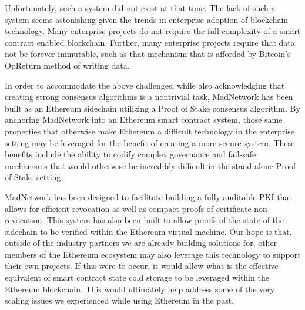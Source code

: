 Unfortunately, such a system did not exist at that time.
The lack of such a system seems astonishing given the trends in
enterprise adoption of blockchain technology.
Many enterprise projects do not require the full complexity of a smart
contract enabled blockchain.
Further, many enterprise projects require that data not be forever
immutable, such as that mechanism that is afforded by Bitcoin's
OpReturn method of writing data.

In order to accommodate the above challenges, while also acknowledging
that creating strong consensus algorithms is a nontrivial task,
MadNetwork has been built as an Ethereum sidechain utilizing a Proof of
Stake consensus algorithm.
By anchoring MadNetwork into an Ethereum smart contract system, those
same properties that otherwise make Ethereum a difficult technology in
the enterprise setting may be leveraged for the benefit of creating a
more secure system.
These benefits include the ability to codify complex governance and
fail-safe mechanisms that would otherwise be incredibly difficult in
the stand-alone Proof of Stake setting.

MadNetwork has been designed to facilitate building a fully-auditable
PKI that allows for efficient revocation as well as compact proofs of
certificate non-revocation.
This system has also been built to allow proofs of the state of the
sidechain to be verified within the Ethereum virtual machine.
Our hope is that, outside of the industry partners we are already
building solutions for, other members of the Ethereum ecosystem may
also leverage this technology to support their own projects.
If this were to occur, it would allow what is the effective equivalent
of smart contract state cold storage to be leveraged within the
Ethereum blockchain.
This would ultimately help address some of the very scaling issues we
experienced while using Ethereum in the past.
